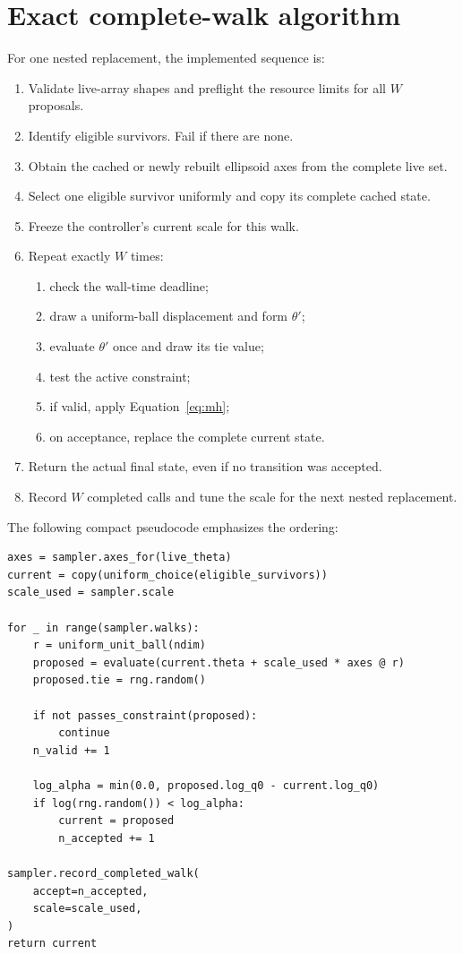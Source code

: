 \documentclass[11pt,a4paper]{article}
\begin{document}
\section{Exact complete-walk algorithm}

For one nested replacement, the implemented sequence is:

\begin{enumerate}
  \item Validate live-array shapes and preflight the resource limits for all
        \(W\) proposals.
  \item Identify eligible survivors.  Fail if there are none.
  \item Obtain the cached or newly rebuilt ellipsoid axes from the complete
        live set.
  \item Select one eligible survivor uniformly and copy its complete cached
        state.
  \item Freeze the controller's current scale for this walk.
  \item Repeat exactly \(W\) times:
    \begin{enumerate}
      \item check the wall-time deadline;
      \item draw a uniform-ball displacement and form \(\theta'\);
      \item evaluate \(\theta'\) once and draw its tie value;
      \item test the active constraint;
      \item if valid, apply Equation~\eqref{eq:mh};
      \item on acceptance, replace the complete current state.
    \end{enumerate}
  \item Return the actual final state, even if no transition was accepted.
  \item Record \(W\) completed calls and tune the scale for the next nested
        replacement.
\end{enumerate}

The following compact pseudocode emphasizes the ordering:

\begin{lstlisting}
axes = sampler.axes_for(live_theta)
current = copy(uniform_choice(eligible_survivors))
scale_used = sampler.scale

for _ in range(sampler.walks):
    r = uniform_unit_ball(ndim)
    proposed = evaluate(current.theta + scale_used * axes @ r)
    proposed.tie = rng.random()

    if not passes_constraint(proposed):
        continue
    n_valid += 1

    log_alpha = min(0.0, proposed.log_q0 - current.log_q0)
    if log(rng.random()) < log_alpha:
        current = proposed
        n_accepted += 1

sampler.record_completed_walk(
    accept=n_accepted,
    scale=scale_used,
)
return current
\end{lstlisting}
\end{document}
